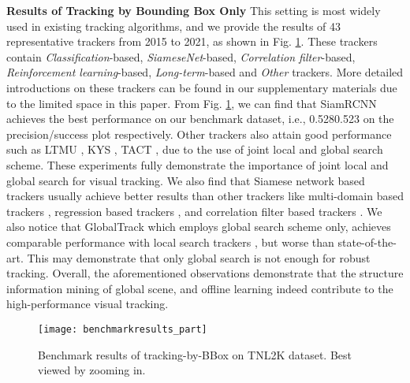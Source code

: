 \documentclass[final]{cvpr}
\begin{document}
\textbf{Results of Tracking by Bounding Box Only}
This setting is most widely used in existing tracking algorithms, and we provide the results of 43 representative trackers from 2015 to 2021, as shown in Fig. \ref{benchmarkresultsBBox}. These trackers contain \emph{Classification}-based, \emph{SiameseNet}-based, \emph{Correlation filter}-based, \emph{Reinforcement learning}-based, \emph{Long-term}-based and \emph{Other} trackers. More detailed introductions on these trackers can be found in our supplementary materials due to the limited space in this paper. From Fig. \ref{benchmarkresultsBBox}, we can find that SiamRCNN \cite{voigtlaender2020siamRCNN} achieves the best performance on our benchmark dataset, i.e., 0.5280.523 on the precision/success plot respectively. Other trackers also attain good performance such as LTMU \cite{dai2020ltmu}, KYS \cite{Goutam2020KYS}, TACT \cite{choi2020TACT}, due to the use of joint local and global search scheme. These experiments fully demonstrate the importance of joint local and global search for visual tracking. We also find that Siamese network based trackers usually achieve better results than other trackers like multi-domain based trackers \cite{Jung_2018_ECCV, Park_2018_ECCV, Nam2015Learning}, regression based trackers \cite{held2016GOTURN}, and correlation filter based trackers \cite{Henriques2015High, bertinetto2016staple, Danelljan2016ECO}. We also notice that GlobalTrack \cite{huang2019globaltrack} which employs global search scheme only, achieves comparable performance with local search trackers \cite{zhang2020ocean, Nam2015Learning}, but worse than state-of-the-art. This may demonstrate that only global search is not enough for robust tracking. Overall, the aforementioned observations demonstrate that the structure information mining of global scene, and offline learning indeed contribute to the high-performance visual tracking. 



\begin{figure} 
\center
\texttt{[image: benchmarkresults\_part]}
\caption{Benchmark results of tracking-by-BBox on TNL2K dataset. Best viewed by zooming in. }
\label{benchmarkresultsBBox}
\end{figure} 	
\end{document}
